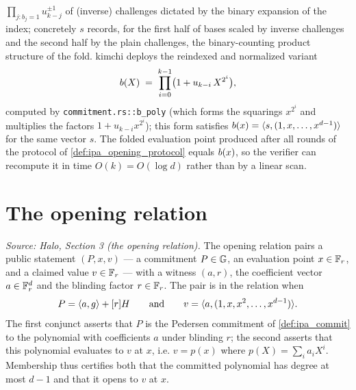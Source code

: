 \begin{definition}
  \(\prod_{j : b_{j} = 1} u_{k - j}^{\pm 1}\) of (inverse) challenges dictated by
  the binary expansion of the index; concretely \(s\) records, for the first half
  of bases scaled by inverse challenges and the second half by the plain
  challenges, the binary-counting product structure of the fold. kimchi deploys
  the reindexed and normalized variant
  \[
    b(X) \;=\; \prod_{i=0}^{k-1}\bigl(1 + u_{k-i}\, X^{2^{i}}\bigr),
  \]
  computed by \texttt{commitment.rs::b\_poly} (which forms the squarings
  \(x^{2^{i}}\) and multiplies the factors \(1 + u_{k-i} x^{2^{i}}\)); this form
  satisfies \(b(x) = \langle s, (1, x, \dots, x^{d-1}) \rangle\) for the same vector
  \(s\). The folded evaluation point produced after all rounds of the protocol of
  \cref{def:ipa_opening_protocol} equals \(b(x)\), so the verifier can
  recompute it in time \(O(k) = O(\log d)\) rather than by a linear scan.
\end{definition}

\section{The opening relation}

\begin{definition}
  \label{def:ipa_relation}
  \textit{Source: Halo, Section 3 (the opening relation).}
  The opening relation pairs a public statement \((P, x, v)\) — a commitment
  \(P \in \mathbb{G}\), an evaluation point \(x \in \mathbb{F}_r\), and a claimed value
  \(v \in \mathbb{F}_r\) — with a witness \((a, r)\), the coefficient vector
  \(a \in \mathbb{F}_r^{d}\) and the blinding factor \(r \in \mathbb{F}_r\). The pair is in the
  relation when
  \[
    P = \langle a, g \rangle + [r]H
    \qquad\text{and}\qquad
    v = \langle a, (1, x, x^{2}, \dots, x^{d-1}) \rangle.
  \]
  The first conjunct asserts that \(P\) is the Pedersen commitment of
  \cref{def:ipa_commit} to the polynomial with coefficients \(a\) under blinding
  \(r\); the second asserts that this polynomial evaluates to \(v\) at \(x\), i.e.
  \(v = p(x)\) where \(p(X) = \sum_{i} a_{i} X^{i}\). Membership thus certifies
  both that the committed polynomial has degree at most \(d - 1\) and that it
  opens to \(v\) at \(x\).
\end{definition}

